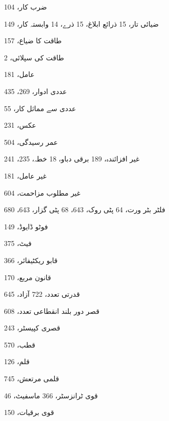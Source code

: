 \begin{theindex}
\indexspace

\item ضرب کار، 104
\item ضیائی 
     \subitem تار، 15 
     \subitem ذرائع ابلاغ، 15 
     \subitem ذرے، 14 
     \subitem وابستہ کار، 149

\indexspace

\item طاقت کا ضیاع، 157
\item طاقت کی سپلائی، 2

\indexspace

\item عامل، 181
\item عددی ادوار، 269، 435
\item عددی سے مماثل کار، 55
\item عکس، 231
\item عمر رسیدگی، 504

\indexspace

\item غیر افزائندہ، 189 
     \subitem برقی دباو، 18 
     \subitem خطہ، 235، 241
\item غیر عامل، 181
\item غیر مطلوب مزاحمت، 604

\indexspace

\item فلٹر 
     \subitem بٹر ورت، 64 
     \subitem پٹی روک، 643، 68 
     \subitem پٹی گزار، 643، 680
\item فوٹو ڈایوڈ، 149
\item فیٹ، 375

\indexspace

\item قابو ریکٹیفائر، 366
\item قانون مربع، 170
\item قدرتی تعدد، 722 
     \subitem آزاد، 645
\item قصر دور بلند انقطاعی تعدد، 608
\item قصری کپیسٹر، 243
\item قطب، 570
\item قلم، 126
\item قلمی مرتعش، 745
\item قوی 
     \subitem ٹرانزسٹر، 366 
     \subitem ماسفیٹ، 46
\item قوی برقیات، 150

\indexspace


\end{theindex}
